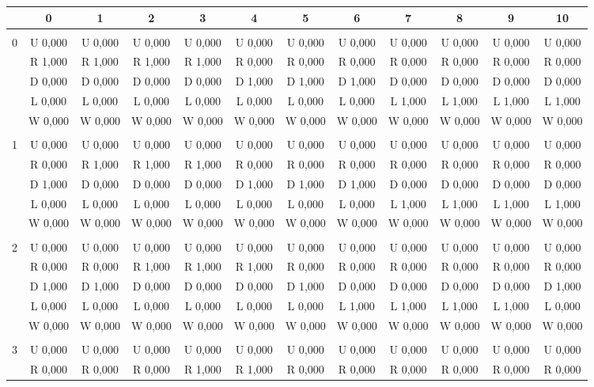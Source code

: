 \begin{table}[htbp]
\label{policyLabelPred}
\centering
\begin{tiny}
\begin{tabular}{c|c|c|c|c|c|c|c|c|c|c|c|}
&0&1&2&3&4&5&6&7&8&9&10\\ \hline\\
0&U 0,000&U 0,000&U 0,000&U 0,000&U 0,000&U 0,000&U 0,000&U 0,000&U 0,000&U 0,000&U 0,000\\
&R 1,000&R 1,000&R 1,000&R 1,000&R 0,000&R 0,000&R 0,000&R 0,000&R 0,000&R 0,000&R 0,000\\
&D 0,000&D 0,000&D 0,000&D 0,000&D 1,000&D 1,000&D 1,000&D 0,000&D 0,000&D 0,000&D 0,000\\
&L 0,000&L 0,000&L 0,000&L 0,000&L 0,000&L 0,000&L 0,000&L 1,000&L 1,000&L 1,000&L 1,000\\
&W 0,000&W 0,000&W 0,000&W 0,000&W 0,000&W 0,000&W 0,000&W 0,000&W 0,000&W 0,000&W 0,000\\
\hline \\
1&U 0,000&U 0,000&U 0,000&U 0,000&U 0,000&U 0,000&U 0,000&U 0,000&U 0,000&U 0,000&U 0,000\\
&R 0,000&R 1,000&R 1,000&R 1,000&R 0,000&R 0,000&R 0,000&R 0,000&R 0,000&R 0,000&R 0,000\\
&D 1,000&D 0,000&D 0,000&D 0,000&D 1,000&D 1,000&D 1,000&D 0,000&D 0,000&D 0,000&D 0,000\\
&L 0,000&L 0,000&L 0,000&L 0,000&L 0,000&L 0,000&L 0,000&L 1,000&L 1,000&L 1,000&L 1,000\\
&W 0,000&W 0,000&W 0,000&W 0,000&W 0,000&W 0,000&W 0,000&W 0,000&W 0,000&W 0,000&W 0,000\\
\hline \\
2&U 0,000&U 0,000&U 0,000&U 0,000&U 0,000&U 0,000&U 0,000&U 0,000&U 0,000&U 0,000&U 0,000\\
&R 0,000&R 0,000&R 1,000&R 1,000&R 1,000&R 0,000&R 0,000&R 0,000&R 0,000&R 0,000&R 0,000\\
&D 1,000&D 1,000&D 0,000&D 0,000&D 0,000&D 1,000&D 0,000&D 0,000&D 0,000&D 0,000&D 1,000\\
&L 0,000&L 0,000&L 0,000&L 0,000&L 0,000&L 0,000&L 1,000&L 1,000&L 1,000&L 1,000&L 0,000\\
&W 0,000&W 0,000&W 0,000&W 0,000&W 0,000&W 0,000&W 0,000&W 0,000&W 0,000&W 0,000&W 0,000\\
\hline \\
3&U 0,000&U 0,000&U 0,000&U 0,000&U 0,000&U 0,000&U 0,000&U 0,000&U 0,000&U 0,000&U 0,000\\
&R 0,000&R 0,000&R 0,000&R 1,000&R 1,000&R 0,000&R 0,000&R 0,000&R 0,000&R 0,000&R 0,000\\

\end{tabular}
\end{tiny}
\end{table}
